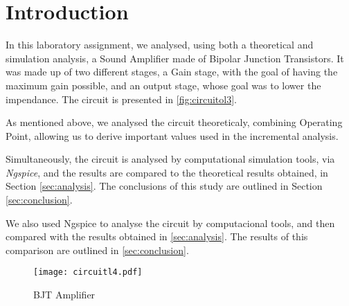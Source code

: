 \section{Introduction}
\label{sec:introduction}
In this laboratory assignment, we analysed, using both a theoretical and simulation analysis, a Sound Amplifier made of Bipolar Junction Transistors. It was made up of two different stages, a Gain stage, with the goal of having the maximum gain possible, and an output stage, whose goal was to lower the impendance. The circuit is presented in \ref{fig:circuitol3}.

As mentioned above, we analysed the circuit theoreticaly, combining Operating Point, allowing us to derive important values used in the incremental analysis.

Simultaneously, the circuit is analysed by computational simulation tools, via \textit{Ngspice}, and the results are compared to the theoretical results obtained, in Section \ref{sec:analysis}. The conclusions of this study are outlined in Section \ref{sec:conclusion}.

We also used Ngspice to analyse the circuit by computacional tools, and then compared with the results obtained in \ref{sec:analysis}. The results of this comparison are outlined in \ref{sec:conclusion}.



\begin{figure}[h] \centering
\texttt{[image: circuitl4.pdf]}
\caption{BJT Amplifier}
\label{fig:circuitol4}
\end{figure}

\clearpage
